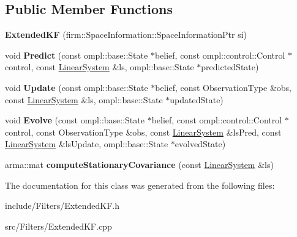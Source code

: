 \subsection*{\-Public \-Member \-Functions}
\begin{DoxyCompactItemize}
\item 
\hypertarget{class_extended_k_f_a4fd20fe66ee89ad9c4103557afc9836c}{{\bfseries \-Extended\-K\-F} (firm\-::\-Space\-Information\-::\-Space\-Information\-Ptr si)}\label{class_extended_k_f_a4fd20fe66ee89ad9c4103557afc9836c}

\item 
\hypertarget{class_extended_k_f_aa622a74dcda7a4abb78334df8c850a3e}{void {\bfseries \-Predict} (const ompl\-::base\-::\-State $\ast$belief, const ompl\-::control\-::\-Control $\ast$control, const \hyperlink{class_linear_system}{\-Linear\-System} \&ls, ompl\-::base\-::\-State $\ast$predicted\-State)}\label{class_extended_k_f_aa622a74dcda7a4abb78334df8c850a3e}

\item 
\hypertarget{class_extended_k_f_ae89c058d2f53b4740957d3234110ad50}{void {\bfseries \-Update} (const ompl\-::base\-::\-State $\ast$belief, const \-Observation\-Type \&obs, const \hyperlink{class_linear_system}{\-Linear\-System} \&ls, ompl\-::base\-::\-State $\ast$updated\-State)}\label{class_extended_k_f_ae89c058d2f53b4740957d3234110ad50}

\item 
\hypertarget{class_extended_k_f_abac2469798813a08cb9d482509bc6dce}{void {\bfseries \-Evolve} (const ompl\-::base\-::\-State $\ast$belief, const ompl\-::control\-::\-Control $\ast$control, const \-Observation\-Type \&obs, const \hyperlink{class_linear_system}{\-Linear\-System} \&ls\-Pred, const \hyperlink{class_linear_system}{\-Linear\-System} \&ls\-Update, ompl\-::base\-::\-State $\ast$evolved\-State)}\label{class_extended_k_f_abac2469798813a08cb9d482509bc6dce}

\item 
\hypertarget{class_extended_k_f_a2aaf37aae5d4105c384f88b6c948e4cb}{arma\-::mat {\bfseries compute\-Stationary\-Covariance} (const \hyperlink{class_linear_system}{\-Linear\-System} \&ls)}\label{class_extended_k_f_a2aaf37aae5d4105c384f88b6c948e4cb}

\end{DoxyCompactItemize}


\-The documentation for this class was generated from the following files\-:\begin{DoxyCompactItemize}
\item 
include/\-Filters/\-Extended\-K\-F.\-h\item 
src/\-Filters/\-Extended\-K\-F.\-cpp\end{DoxyCompactItemize}
